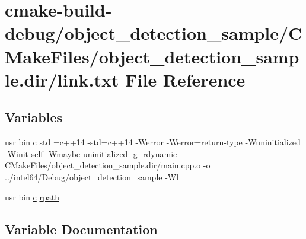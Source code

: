 \hypertarget{object__detection__sample_2CMakeFiles_2object__detection__sample_8dir_2link_8txt}{}\section{cmake-\/build-\/debug/object\+\_\+detection\+\_\+sample/\+C\+Make\+Files/object\+\_\+detection\+\_\+sample.dir/link.txt File Reference}
\label{object__detection__sample_2CMakeFiles_2object__detection__sample_8dir_2link_8txt}
\subsection*{Variables}
\begin{DoxyCompactItemize}
\item 
usr bin \hyperlink{CMakeCache_8txt_aac1d6a1710812201527c735f7c6afbaa}{c} \hyperlink{object__detection__sample_2CMakeFiles_2object__detection__sample_8dir_2link_8txt_a1ccfea5f558575a112db71eeb271fabf}{std} =\hyperlink{CMakeCache_8txt_aac1d6a1710812201527c735f7c6afbaa}{c}++14 -\/std=\hyperlink{CMakeCache_8txt_aac1d6a1710812201527c735f7c6afbaa}{c}++14 -\/Werror -\/Werror=return-\/type -\/Wuninitialized -\/Winit-\/self -\/Wmaybe-\/uninitialized -\/g -\/rdynamic C\+Make\+Files/object\+\_\+detection\+\_\+sample.\+dir/main.\+cpp.\+o -\/o ../intel64/Debug/object\+\_\+detection\+\_\+sample -\/\hyperlink{thirdparty_2extension_2CMakeFiles_2cpu__extension_8dir_2link_8txt_af9ccbf658ed2deb89d0d79f211e5b033}{Wl}
\item 
usr bin \hyperlink{CMakeCache_8txt_aac1d6a1710812201527c735f7c6afbaa}{c} \hyperlink{object__detection__sample_2CMakeFiles_2object__detection__sample_8dir_2link_8txt_ab9d7fd7120fafa2118a4e08c1df697c7}{rpath}
\end{DoxyCompactItemize}


\subsection{Variable Documentation}
